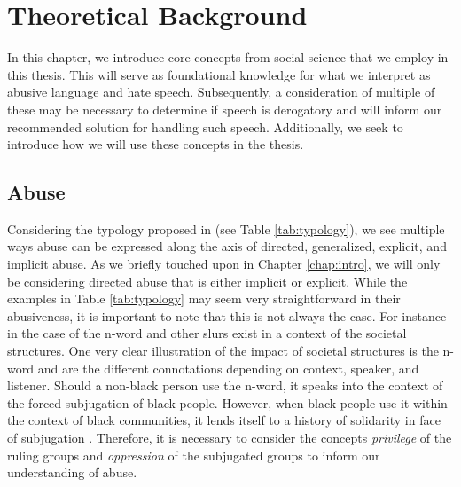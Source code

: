 

\chapter{Theoretical Background}\label{chap:socialscience}
In this chapter, we introduce core concepts from social science that we employ in this thesis. This will serve as foundational knowledge for what we interpret as abusive language and hate speech. Subsequently, a consideration of multiple of these may be necessary to determine if speech is derogatory and will inform our recommended solution for handling such speech. Additionally, we seek to introduce how we will use these concepts in the thesis.

\section{Abuse}
Considering the typology proposed in \cite{Waseem:2017} (see Table \ref{tab:typology}), we see multiple ways abuse can be expressed along the axis of directed, generalized, explicit, and implicit abuse. As we briefly touched upon in Chapter \ref{chap:intro}, we will only be considering directed abuse that is either implicit or explicit. While the examples in Table \ref{tab:typology} may seem very straightforward in their abusiveness, it is important to note that this is not always the case. For instance in the case of the n-word and other slurs exist in a context of the societal structures. One very clear illustration of the impact of societal structures is the n-word and are the different connotations depending on context, speaker, and listener. Should a non-black person use the n-word, it speaks into the context of the forced subjugation of black people. However, when black people use it within the context of black communities, it lends itself to a history of solidarity in face of subjugation \citep{Rahman:2011}. Therefore, it is necessary to consider the concepts {\it privilege} of the ruling groups and {\it oppression} of the subjugated groups to inform our understanding of abuse.

